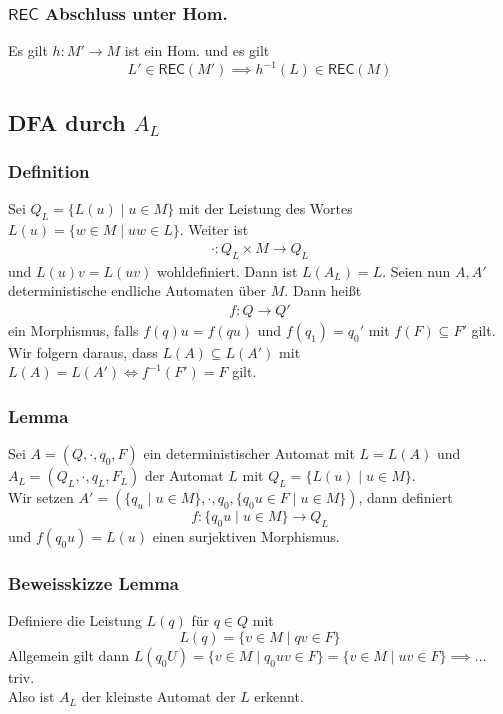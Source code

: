 \documentclass[12pt, german]{article}
\newcommand{\inv}{^{-1}}
\newcommand{\rec}{\mathsf{REC}}
\begin{document}
	\subsubsection{$\rec$ Abschluss unter Hom.}
	Es gilt $h: M' \to M$ ist ein Hom. und es gilt $$L' \in \rec(M') \implies h\inv(L) \in \rec(M)$$
	
	\subsection{DFA durch $A_L$}
	\subsubsection{Definition}
	Sei $Q_L = \{L(u) \mid u \in M\}$ mit der Leistung des Wortes $L(u) = \{ w \in M \mid uw \in L\}$. Weiter ist 
	\begin{align*}
		\cdot: Q_L \times M  \to Q_L
	\end{align*}
	und $L(u)v = L(uv)$ wohldefiniert. Dann ist $L(A_L) = L$. 
	Seien nun $A, A'$ deterministische endliche Automaten über $M$. Dann heißt 
	\begin{align*}
		f: Q \to Q'
	\end{align*} ein Morphismus, falls $f(q)u=f(qu)$ und $f(q_1) = q_0'$ mit $f(F) \subseteq F'$ gilt.
	Wir folgern daraus, dass $L(A) \subseteq L(A')$ mit $L(A) = L(A') \iff f\inv(F') = F$ gilt. 
	
	\subsubsection{Lemma}
	Sei $A = (Q, \cdot, q_0, F)$ ein deterministischer Automat mit $L = L(A)$ und $A_L = (Q_L, \cdot, q_L, F_L)$ der Automat $L$ mit $Q_L = \{L(u) \mid u \in M\}$.  \\
	
	Wir setzen $A' = (\{q_u \mid u \in M\}, \cdot, q_0, \{q_0u \in F \mid u \in M\})$, dann definiert $$f: \{q_0u \mid u \in M\} \to Q_L$$ und $f(q_0u) = L(u)$ einen surjektiven Morphismus.
	
	\subsubsection{Beweisskizze Lemma}
	Definiere die Leistung $L(q)$ für $q \in Q$ mit $$L(q) = \{v \in M \mid qv \in F\}$$ Allgemein gilt dann $L(q_0U) = \{v \in M \mid q_0uv \in F\} = \{v \in M \mid uv \in F\} \implies \ldots$ triv. \\
	Also ist $A_L$ der kleinste Automat der $L$ erkennt.
	
\end{document}
